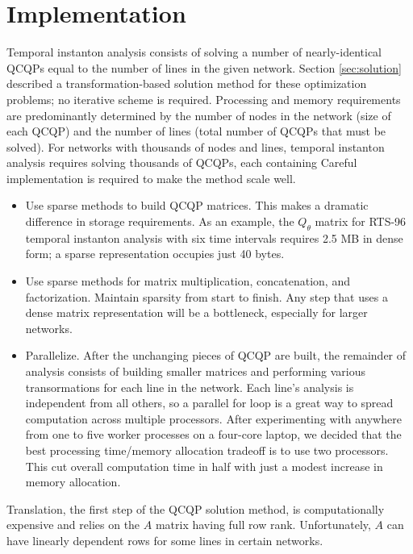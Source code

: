 \documentclass[journal,twoside]{IEEEtran}
\begin{document}
\section{Implementation}\label{sec:implementation}

Temporal instanton analysis consists of solving a number of nearly-identical QCQPs equal to the number of lines in the given network. Section \ref{sec:solution} described a transformation-based solution method for these optimization problems; no iterative scheme is required. Processing and memory requirements are predominantly determined by the number of nodes in the network (size of each QCQP) and the number of lines (total number of QCQPs that must be solved). For networks with thousands of nodes and lines, temporal instanton analysis requires solving thousands of QCQPs, each containing  Careful implementation is required to make the method scale well.

\begin{itemize}
    \item Use sparse methods to build QCQP matrices. This makes a dramatic difference in storage requirements. As an example, the $Q_\theta$ matrix for RTS-96 temporal instanton analysis with six time intervals requires 2.5 MB in dense form; a sparse representation occupies just 40 bytes.
    \item Use sparse methods for matrix multiplication, concatenation, and factorization. Maintain sparsity from start to finish. Any step that uses a dense matrix representation will be a bottleneck, especially for larger networks.
    \item Parallelize. After the unchanging pieces of QCQP are built, the remainder of analysis consists of building smaller matrices and performing various transormations for each line in the network. Each line's analysis is independent from all others, so a parallel for loop is a great way to spread computation across multiple processors. After experimenting with anywhere from one to five worker processes on a four-core laptop, we decided that the best processing time/memory allocation tradeoff is to use two processors. This cut overall computation time in half with just a modest increase in memory allocation.
\end{itemize}

Translation, the first step of the QCQP solution method, is computationally expensive and relies on the $A$ matrix having full row rank. Unfortunately, $A$ can have linearly dependent rows for some lines in certain networks.
\end{document}
